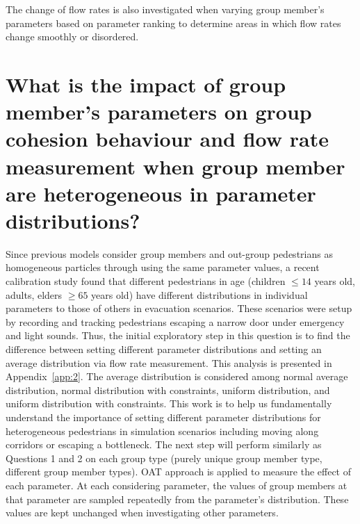 \documentclass[a4paper,11pt,phdthesis,singlespace,twoside]{cssethesis}
\begin{document}
The change of flow rates is also investigated when varying group member’s parameters based on parameter ranking to determine areas in which flow rates change smoothly or disordered. 

\section{What is the impact of group member's parameters on group cohesion behaviour and flow rate measurement when group member are heterogeneous in parameter distributions?}
Since previous models consider group members and out-group pedestrians as homogeneous particles through using the same parameter values, a recent calibration study \cite{Daamen2012} found that different pedestrians in age (children $ \leq 14 $ years old, adults, elders $ \geq 65 $ years old) have different distributions in individual parameters to those of others in evacuation scenarios. These scenarios were setup by recording and tracking pedestrians escaping a narrow door under emergency and light sounds.
Thus, the initial exploratory step in this question is to find the difference between setting different parameter distributions and setting an average distribution via flow rate measurement. This analysis is presented in Appendix~\ref{app:2}. The average distribution is considered among normal average distribution, normal distribution with constraints, uniform distribution, and uniform distribution with constraints. This work is to help us fundamentally understand the importance of setting different parameter distributions for heterogeneous pedestrians in simulation scenarios including moving along corridors or escaping a bottleneck. 
The next step will perform similarly as Questions 1 and 2 on each group type (purely unique group member type, different group member types). OAT approach is applied to measure the effect of each parameter. At each considering parameter, the values of group members at that parameter are sampled repeatedly from the parameter’s distribution. These values are kept unchanged when investigating other parameters.
\end{document}
